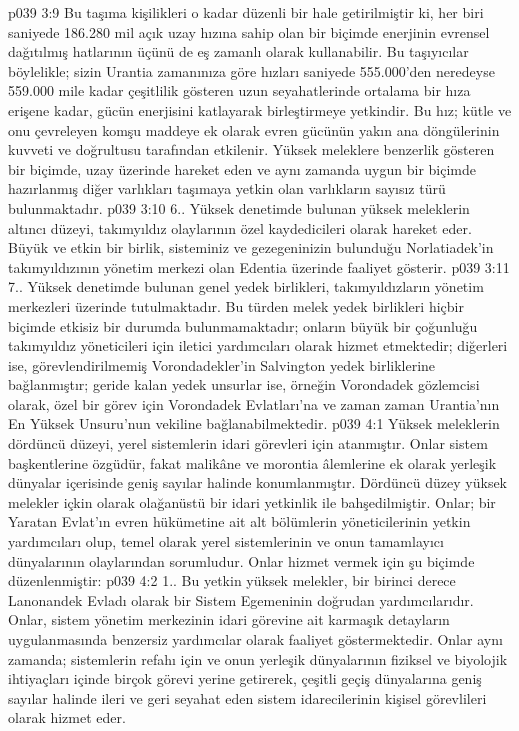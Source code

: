 \vs p039 3:9 Bu taşıma kişilikleri o kadar düzenli bir hale getirilmiştir ki, her biri saniyede 186.280 mil açık uzay hızına sahip olan bir biçimde enerjinin evrensel dağıtılmış hatlarının üçünü de eş zamanlı olarak kullanabilir. Bu taşıyıcılar böylelikle; sizin Urantia zamanınıza göre hızları saniyede 555.000’den neredeyse 559.000 mile kadar çeşitlilik gösteren uzun seyahatlerinde ortalama bir hıza erişene kadar, gücün enerjisini katlayarak birleştirmeye yetkindir. Bu hız; kütle ve onu çevreleyen komşu maddeye ek olarak evren gücünün yakın ana döngülerinin kuvveti ve doğrultusu tarafından etkilenir. Yüksek meleklere benzerlik gösteren bir biçimde, uzay üzerinde hareket eden ve aynı zamanda uygun bir biçimde hazırlanmış diğer varlıkları taşımaya yetkin olan varlıkların sayısız türü bulunmaktadır.
\vs p039 3:10 6.\bibnobreakspace {}. Yüksek denetimde bulunan yüksek meleklerin altıncı düzeyi, takımyıldız olaylarının özel kaydedicileri olarak hareket eder. Büyük ve etkin bir birlik, sisteminiz ve gezegeninizin bulunduğu Norlatiadek’in takımyıldızının yönetim merkezi olan Edentia üzerinde faaliyet gösterir.
\vs p039 3:11 7.\bibnobreakspace {}. Yüksek denetimde bulunan genel yedek birlikleri, takımyıldızların yönetim merkezleri üzerinde tutulmaktadır. Bu türden melek yedek birlikleri hiçbir biçimde etkisiz bir durumda bulunmamaktadır; onların büyük bir çoğunluğu takımyıldız yöneticileri için iletici yardımcıları olarak hizmet etmektedir; diğerleri ise, görevlendirilmemiş Vorondadekler’in Salvington yedek birliklerine bağlanmıştır; geride kalan yedek unsurlar ise, örneğin Vorondadek gözlemcisi olarak, özel bir görev için Vorondadek Evlatları’na ve zaman zaman Urantia’nın En Yüksek Unsuru’nun vekiline bağlanabilmektedir.
\vs p039 4:1 Yüksek meleklerin dördüncü düzeyi, yerel sistemlerin idari görevleri için atanmıştır. Onlar sistem başkentlerine özgüdür, fakat malikâne ve morontia âlemlerine ek olarak yerleşik dünyalar içerisinde geniş sayılar halinde konumlanmıştır. Dördüncü düzey yüksek melekler içkin olarak olağanüstü bir idari yetkinlik ile bahşedilmiştir. Onlar; bir Yaratan Evlat’ın evren hükümetine ait alt bölümlerin yöneticilerinin yetkin yardımcıları olup, temel olarak yerel sistemlerinin ve onun tamamlayıcı dünyalarının olaylarından sorumludur. Onlar hizmet vermek için şu biçimde düzenlenmiştir:
\vs p039 4:2 1.\bibnobreakspace {}. Bu yetkin yüksek melekler, bir birinci derece Lanonandek Evladı olarak bir Sistem Egemeninin doğrudan yardımcılarıdır. Onlar, sistem yönetim merkezinin idari görevine ait karmaşık detayların uygulanmasında benzersiz yardımcılar olarak faaliyet göstermektedir. Onlar aynı zamanda; sistemlerin refahı için ve onun yerleşik dünyalarının fiziksel ve biyolojik ihtiyaçları içinde birçok görevi yerine getirerek, çeşitli geçiş dünyalarına geniş sayılar halinde ileri ve geri seyahat eden sistem idarecilerinin kişisel görevlileri olarak hizmet eder.
